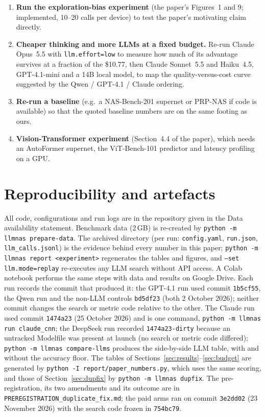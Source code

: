 \documentclass[preprint,12pt,authoryear]{elsarticle}
\newcommand{\code}[1]{\texttt{#1}}
\begin{document}
\begin{enumerate}
  \item \textbf{Run the exploration-bias experiment} (the paper's Figures~1 and 9; implemented, 10--20 calls per device) to test the paper's motivating claim directly.
  \item \textbf{Cheaper thinking and more LLMs at a fixed budget.} Re-run Claude Opus~5.5 with \code{llm.effort=low} to measure how much of its advantage survives at a fraction of the \$10.77, then Claude Sonnet~5.5 and Haiku~4.5, GPT-4.1-mini and a 14B local model, to map the quality-versus-cost curve suggested by the Qwen / GPT-4.1 / Claude ordering.
  \item \textbf{Re-run a baseline} (e.g.\ a NAS-Bench-201 supernet or PRP-NAS if code is available) so that the quoted baseline numbers are on the same footing as ours.
  \item \textbf{Vision-Transformer experiment} (Section~4.4 of the paper), which needs an AutoFormer supernet, the ViT-Bench-101 predictor and latency profiling on a GPU.
\end{enumerate}

\section{Reproducibility and artefacts}
All code, configurations and run logs are in the repository given in the Data availability statement. Benchmark data (2\,GB) is re-created by \code{python -m llmnas prepare-data}. The archived  directory (per run: \code{config.yaml}, \code{run.json}, \code{llm\_calls.jsonl}) is the evidence behind every number in this paper; \code{python -m llmnas report <experiment>} regenerates the tables and figures, and \code{--set llm.mode=replay} re-executes any LLM search without API access. A Colab notebook performs the same steps with data and results on Google Drive. Each run records the commit that produced it: the GPT-4.1 run used commit \code{1b5cf55}, the Qwen run and the non-LLM controls \code{bd5df23} (both 2 October 2026); neither commit changes the search or metric code relative to the other. The Claude run used commit \code{1474a23} (25 October 2026) and is one command, \code{python -m llmnas run claude\_cnn}; the DeepSeek run recorded \code{1474a23-dirty} because an untracked Modelfile was present at launch (no search or metric code differed); \code{python -m llmnas compare-llms} produces the side-by-side LLM table, with and without the accuracy floor. The tables of Sections~\ref{sec:results}--\ref{sec:budget} are generated by \code{python -I report/paper\_numbers.py}, which uses the same scoring, and those of Section~\ref{sec:dupfix} by \code{python -m llmnas dupfix}. The pre-registration, its two amendments and its outcome are in \code{PREREGISTRATION\_duplicate\_fix.md}; the paid arms ran on commit \code{3e2dd02} (23 November 2026) with the search code frozen in \code{754bc79}.
\end{document}
